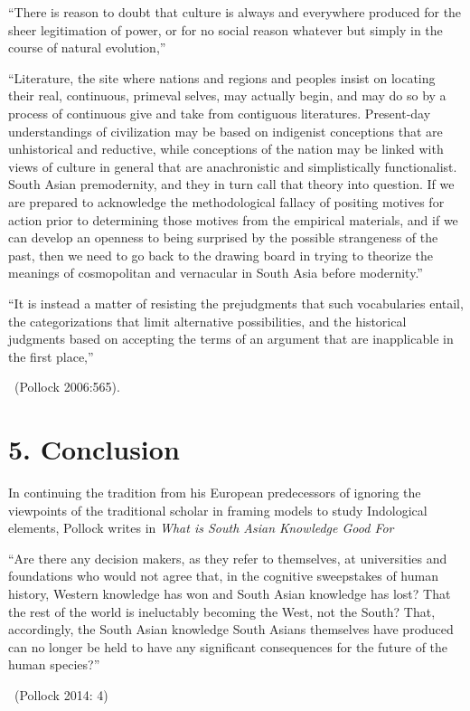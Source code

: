 “There is reason to doubt that culture is always and everywhere produced for the sheer legitimation of power, or for no social reason whatever but simply in the course of natural evolution,”

“Literature, the site where nations and regions and peoples insist on locating their real, continuous, primeval selves, may actually begin, and may do so by a process of continuous give and take from contiguous literatures. Present-day understandings of civilization may be based on indigenist conceptions that are unhistorical and reductive, while conceptions of the nation may be linked with views of culture in general that are anachronistic and simplistically functionalist. South Asian premodernity, and they in turn call that theory into question. If we are prepared to acknowledge the methodological fallacy of positing motives for action prior to determining those motives from the empirical materials, and if we can develop an openness to being surprised by the possible strangeness of the past, then we need to go back to the drawing board in trying to theorize the meanings of cosmopolitan and vernacular in South Asia before modernity.”

\begin{myquote}
“It is instead a matter of resisting the prejudgments that such vocabularies entail, the categorizations that limit alternative possibilities, and the historical judgments based on accepting the terms of an argument that are inapplicable in the first place,” 

~\hfill (Pollock 2006:565).
\end{myquote}


\section*{5. Conclusion}

In continuing the tradition from his European predecessors of ignoring the viewpoints of the traditional scholar in framing models to study Indological elements, Pollock writes in \textit{What is South Asian Knowledge Good For}

\begin{myquote}
“Are there any decision makers, as they refer to themselves, at universities and foundations who would not agree that, in the cognitive sweepstakes of human history, Western knowledge has won and South Asian knowledge has lost? That the rest of the world is ineluctably becoming the West, not the South? That, accordingly, the South Asian knowledge South Asians themselves have produced can no longer be held to have any significant consequences for the future of the human species?” 

~\hfill (Pollock 2014: 4)
\end{myquote}

